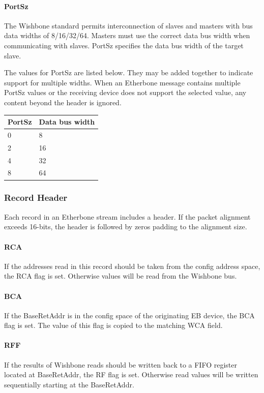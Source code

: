 \documentclass{article}
\begin{document}
\paragraph{PortSz} \label{field:PortSz}
The Wishbone standard permits interconnection of slaves and masters 
with bus data widths of 8/16/32/64.
Masters must use the correct data bus width when communicating with slaves.
PortSz specifies the data bus width of the target slave.

The values for PortSz are listed below.
They may be added together to indicate support for multiple widths.
When an Etherbone message contains multiple PortSz values
or the receiving device does not support the selected value, 
any content beyond the header is ignored.

\vspace{1em}
\begin{tabular}{|l|l|}
\hline
PortSz & Data bus width \\
\hline
0 & 8 \\
2 & 16 \\
4 & 32 \\
8 & 64 \\
\hline
\end{tabular}

\subsubsection{Record Header}

Each record in an Etherbone stream includes a header.
If the packet alignment exceeds 16-bits, 
the header is followed by zeros padding to the alignment size.

\paragraph{RCA} \label{field:RCA}
If the addresses read in this record should be taken from the config
address space, the RCA flag is set.
Otherwise values will be read from the Wishbone bus.

\paragraph{BCA} \label{field:BCA}
If the BaseRetAddr is in the config space of the originating EB device,
the BCA flag is set.
The value of this flag is copied to the matching WCA field.

\paragraph{RFF} \label{field:RFF}
If the results of Wishbone reads should be written back to a FIFO register
located at BaseRetAddr, the RF flag is set.
Otherwise read values will be written sequentially starting at the
BaseRetAddr.
\end{document}
